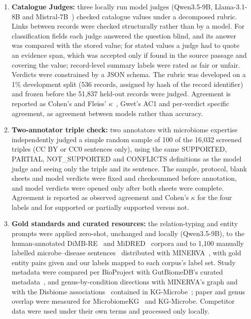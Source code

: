 \documentclass[referee,lineno,pdflatex,sn-vancouver-num]{sn-jnl}
\theoremstyle{thmstyleone}%
\theoremstyle{thmstyletwo}%
\theoremstyle{thmstylethree}%
\begin{document}
\begin{enumerate}
\item \textbf{Catalogue Judges:} three locally run model judges
(Qwen3.5-9B, Llama-3.1-8B and Mistral-7B~\cite{qwen35card,grattafiori2024llama3,jiang2023mistral})
checked catalogue values under a decomposed rubric. Links between records
were checked structurally rather than by a model. For classification
fields each judge answered the question blind, and its answer was compared
with the stored value; for stated values a judge had to quote an evidence
span, which was accepted only if found in the source passage and covering
the value; record-level summary labels were rated as fair or unfair.
Verdicts were constrained by a JSON schema. The rubric was developed on a
1\% development split (536 records, assigned by hash of the record
identifier) and frozen before the 51,837 held-out records were judged.
Agreement is reported as Cohen's and Fleiss' $\kappa$~\cite{cohen1960kappa},
Gwet's AC1 and per-verdict specific agreement, as agreement between models
rather than accuracy.

\item \textbf{Two-annotator triple check:} two annotators with microbiome
expertise independently judged a simple random sample of 100 of the 16,032
screened triples (CC BY or CC0 sentences only), using the same SUPPORTED,
PARTIAL, NOT\_SUPPORTED and CONFLICTS definitions as the model judge and
seeing only the triple and its sentence. The sample, protocol, blank sheets
and model verdicts were fixed and checksummed before annotation, and model
verdicts were opened only after both sheets were complete. Agreement is
reported as observed agreement and Cohen's $\kappa$ for the four labels and
for supported or partially supported versus not.

\item \textbf{Gold standards and curated resources:} the relation-typing and
entity prompts were applied zero-shot, unchanged and locally (Qwen3.5-9B), to
the human-annotated DiMB-RE~\cite{hong2025dimbre} and MiDRED~\cite{hogan2024midred}
corpora and to 1,100 manually labelled microbe--disease
sentences~\cite{karkera2023microbiomere} distributed with
MINERVA~\cite{langarica2025minerva}, with gold entity pairs given and our labels
mapped to each corpus's label set. Study metadata were compared per BioProject
with GutBiomeDB's curated metadata~\cite{zhai2026gutbiomedb}, and
genus-by-condition directions with MINERVA's graph and with the Disbiome
associations~\cite{janssens2018disbiome} contained in
KG-Microbe~\cite{santangelo2026kgmicrobe}; paper and genus overlap were measured
for MicrobiomeKG~\cite{goetz2025microbiomekg} and KG-Microbe. Competitor data
were used under their own terms and processed only locally.
\end{enumerate}
\end{document}
